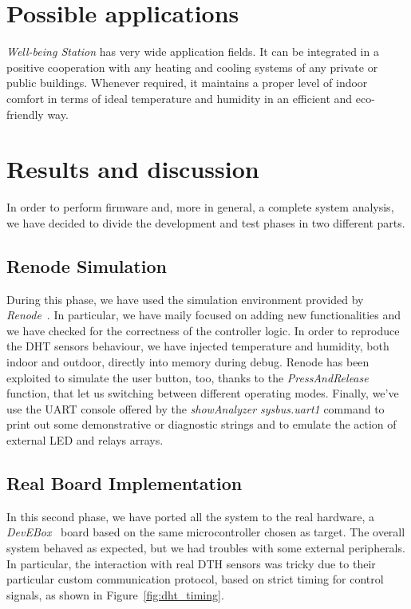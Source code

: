 \documentclass[peerreview]{IEEEtran}
\begin{document}
\section{Possible applications}
\emph{Well-being Station} has very wide application fields. It can be integrated
in a positive cooperation with any heating and cooling systems of any private or
public buildings. Whenever required, it maintains a proper level of indoor
comfort in terms of ideal temperature and humidity in an efficient and
eco-friendly way.

\section{Results and discussion}
In order to perform firmware and, more in general, a complete system analysis,
we have decided to divide the development and test phases in two different parts.
\subsection{Renode Simulation}
	During this phase, we have used the simulation environment provided by 
	\emph{Renode}~\cite{renode}. In particular, we have maily focused on adding 
	new functionalities and we have checked for the correctness of the controller
	logic. In order to reproduce the DHT sensors behaviour, we have injected
	temperature and humidity, both indoor and outdoor, directly into memory
	during debug. Renode has been exploited to simulate the user button, too,
	thanks to the \emph{PressAndRelease} function, that let us switching
	between different operating modes. Finally, we've use the UART console 
	offered by the \emph{showAnalyzer sysbus.uart1} command to print out some 
	demonstrative or diagnostic strings and to emulate the action of external
	LED and relays arrays.
	
	\subsection{Real Board Implementation}
	In this second phase, we have ported all the system to the real hardware, a
	\emph{DevEBox}~\cite{devebox} board based on the same microcontroller chosen
	as target. The overall system behaved as expected, but we had troubles with
	some external peripherals. In particular, the interaction with real DTH sensors
	was	tricky due to their particular custom communication protocol, based on
	strict timing for control signals, as shown in Figure~\ref{fig:dht_timing}.
\end{document}
